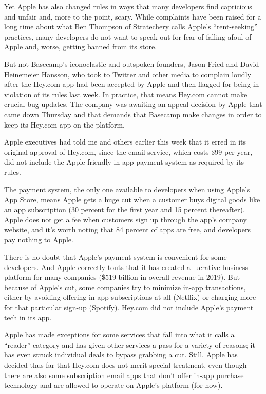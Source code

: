 Yet Apple has also changed rules in ways that many developers find
capricious and unfair and, more to the point, scary. While complaints
have been raised for a long time about what Ben Thompson of Stratechery
calls Apple's ``rent-seeking'' practices, many developers do not want to
speak out for fear of falling afoul of Apple and, worse, getting banned
from its store.

But not Basecamp's iconoclastic and outspoken founders, Jason Fried and
David Heinemeier Hansson, who took to Twitter and other media to
complain loudly after the Hey.com app had been accepted by Apple and
then flagged for being in violation of its rules last week. In practice,
that means Hey.com cannot make crucial bug updates. The company was
awaiting an appeal decision by Apple that came down Thursday and that
demands that Basecamp make changes in order to keep its Hey.com app on
the platform.

Apple executives had told me and others earlier this week that it erred
in its original approval of Hey.com, since the email service, which
costs \$99 per year, did not include the Apple-friendly in-app payment
system as required by its rules.

The payment system, the only one available to developers when using
Apple's App Store, means Apple gets a huge cut when a customer buys
digital goods like an app subscription (30 percent for the first year
and 15 percent thereafter). Apple does not get a fee when customers sign
up through the app's company website, and it's worth noting that 84
percent of apps are free, and developers pay nothing to Apple.

There is no doubt that Apple's payment system is convenient for some
developers. And Apple correctly touts that it has created a lucrative
business platform for many companies (\$519 billion in overall revenue
in 2019). But because of Apple's cut, some companies try to minimize
in-app transactions, either by avoiding offering in-app subscriptions at
all (Netflix) or charging more for that particular sign-up (Spotify).
Hey.com did not include Apple's payment tech in its app.

Apple has made exceptions for some services that fall into what it calls
a ``reader'' category and has given other services a pass for a variety
of reasons; it has even struck individual deals to bypass grabbing a
cut. Still, Apple has decided thus far that Hey.com does not merit
special treatment, even though there are also some subscription email
apps that don't offer in-app purchase technology and are allowed to
operate on Apple's platform (for now).

